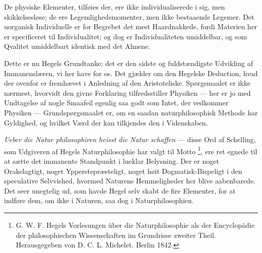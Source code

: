 \documentclass[12pt,a4paper]{book}
\begin{document}
De physiske Elementer, tilføies der, ere ikke individualiserede i sig,
men skikkelsesløse; de ere Legemlighedsmomenter, men ikke bestaaende
Legemer. Det uorganisk Individuelle er for Begrebet det mest
Haardnakkede, fordi Materien her er specificeret til Individualitet;
og dog er Individualiteten umiddelbar, og som Qvalitet umiddelbart
identisk med det Almene.

Dette er nu Hegels Grundtanke; det er den sidste og fuldstændigste
Udvikling af Immanenslæren, vi her have for os. Det gjælder om den
Hegelske Deduction, hvad der ovenfor er fremhævet i Anledning af den
Aristoteliske. Spørgsmaalet er ikke nærmest, hvorvidt den givne
Forklaring tilfredsstiller Physiken --- her er jo med Undtagelse af
nogle
Smaafeil egenlig saa godt som Intet, der vedkommer Physiken ---
Grundspørgsmaalet er, om en saadan naturphilosophisk Methode har
Gyldighed, og hvilket Værd der kan tilkjendes den i Videnskaben.

\textit{Ueber die Natur philosophiren heisst die Natur schaffen} ---
disse Ord af Schelling, som Udgiveren af Hegels Naturphilosophie har
valgt til Motto%
\footnote{%
G. W. F. Hegels Vorlesungen über die Naturphilosophie als der
Encyclopädie der philosophischen Wissenschaften im Grundrisse zweiter
Theil. Herausgegeben von D. C. L. Michelet. Berlin 1842.}, ere ret
egnede til at sætte det immanente Standpunkt i lueklar Belysning. Der
er noget Orakelagtigt, noget Ypperstepræsteligt, noget høit
Dogmatisk-Bispeligt i den speculative Selvvished, hvormed Naturens
Hemmeligheder her blive aabenbarede. Det seer unegtelig ud, som havde
Hegel selv skabt de fire Elementer, for at indføre dem, om ikke i
Naturen, saa dog i Naturphilosophien.
\end{document}
